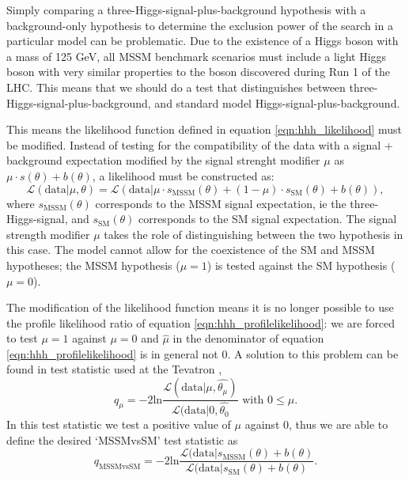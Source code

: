 Simply comparing a three-Higgs-signal-plus-background hypothesis with a background-only 
hypothesis to determine the exclusion power of the search in a particular
model can be problematic. Due to the existence of a Higgs boson with a 
mass of 125 GeV, all MSSM benchmark scenarios must include a light Higgs boson
with very similar properties to the boson discovered during Run 1 of the \ac{LHC}.
This means that we should do a test that distinguishes between three-Higgs-signal-plus-background, and
standard model Higgs-signal-plus-background.

This means the likelihood function defined in equation \ref{eqn:hhh_likelihood}
must be modified. Instead of testing for the compatibility of the data with
a signal + background expectation modified by the signal strenght modifier $\mu$ as
$\mu \cdot s(\theta) + b(\theta)$, a likelihood must be constructed as:
\begin{equation}\label{mssm_likelihood}
\mathcal{L}(\text{data}|\mu, \theta) = \mathcal{L}(\text{data}|\mu \cdot s_{\text{MSSM}}(\theta) + (1-\mu)\cdot s_{\text{SM}}(\theta) + b(\theta)),
\end{equation}
where $s_{\text{MSSM}}(\theta)$ corresponds to the MSSM signal expectation, ie the three-Higgs-signal, and $s_{\text{SM}}(\theta)$ 
corresponds to the SM signal expectation.
The signal strength modifier $\mu$ takes the role of distinguishing between
the two hypothesis in this case. The model cannot allow for the coexistence 
of the SM and MSSM hypotheses; the MSSM hypothesis ($\mu=1$) is tested
against the SM hypothesis ($\mu=0$).

The modification of the likelihood function means it is no longer possible
to use the profile likelihood ratio of equation \ref{eqn:hhh_profilelikelihood}:
we are forced to test $\mu=1$ against $\mu=0$ and 
$\hat{\mu}$ in the denominator of equation \ref{eqn:hhh_profilelikelihood} is in 
general not 0. A solution to this problem can be found in test statistic used at the Tevatron \cite{LHCHComb2011},
\begin{equation}\label{eqn:mssm_tevatron_teststat}
q_{\mu} = -2\text{ln}\frac{\mathcal{L}(\text{data}|\mu,\hat{\theta_{\mu}})}{\mathcal{L}(\text{data}|0,\hat{\theta_0}} \text{ with } 0\leq\mu.
\end{equation}
In this test statistic we test a positive value of $\mu$ against 0, thus we are able to define
the desired `MSSMvsSM' test statistic as
\begin{equation}\label{eqn:mssm_mssmvssm_stat}
q_{\text{MSSMvsSM}} = -2\text{ln}\frac{\mathcal{L}(\text{data}|s_{\text{MSSM}}(\theta) + b(\theta)}{\mathcal{L}(\text{data}|s_{\text{SM}}(\theta)+b(\theta)}.
\end{equation}

